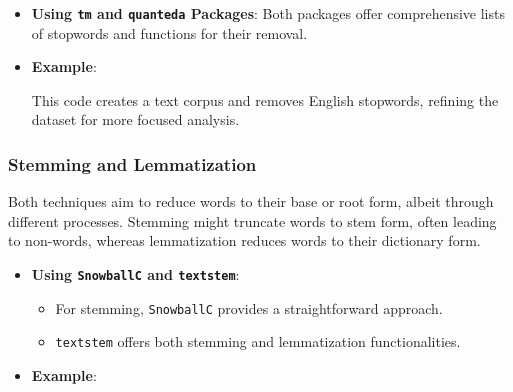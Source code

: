 \documentclass[
]{book}
\newenvironment{Shaded}{\begin{snugshade}}{\end{snugshade}}
\newcommand{\AttributeTok}[1]{\textcolor[rgb]{0.13,0.29,0.53}{#1}}
\newcommand{\FunctionTok}[1]{\textcolor[rgb]{0.13,0.29,0.53}{\textbf{#1}}}
\newcommand{\NormalTok}[1]{#1}
\newcommand{\OtherTok}[1]{\textcolor[rgb]{0.56,0.35,0.01}{#1}}
\newcommand{\SpecialCharTok}[1]{\textcolor[rgb]{0.81,0.36,0.00}{\textbf{#1}}}
\newcommand{\StringTok}[1]{\textcolor[rgb]{0.31,0.60,0.02}{#1}}
\providecommand{\tightlist}{%
  \setlength{\itemsep}{0pt}\setlength{\parskip}{0pt}}
\begin{document}
\begin{itemize}
\item
  \textbf{Using \texttt{tm} and \texttt{quanteda} Packages}: Both packages offer comprehensive lists of stopwords and functions for their removal.
\item
  \textbf{Example}:

\begin{Shaded}
\end{Shaded}

  This code creates a text corpus and removes English stopwords, refining the dataset for more focused analysis.
\end{itemize}

\hypertarget{stemming-and-lemmatization}{%
\subsubsection{Stemming and Lemmatization}\label{stemming-and-lemmatization}}

Both techniques aim to reduce words to their base or root form, albeit through different processes. Stemming might truncate words to stem form, often leading to non-words, whereas lemmatization reduces words to their dictionary form.

\begin{itemize}
\item
  \textbf{Using \texttt{SnowballC} and \texttt{textstem}}:

  \begin{itemize}
  \tightlist
  \item
    For stemming, \texttt{SnowballC} provides a straightforward approach.
  \item
    \texttt{textstem} offers both stemming and lemmatization functionalities.
  \end{itemize}
\item
  \textbf{Example}:

\begin{Shaded}
\end{Shaded}
\end{itemize}
\end{document}
